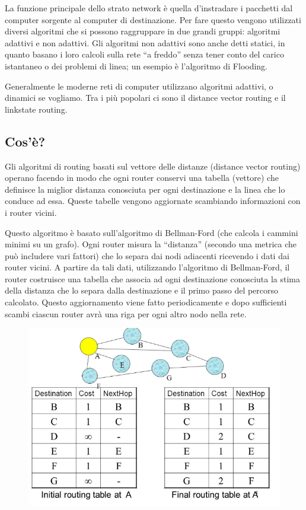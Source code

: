 La funzione principale dello strato network è quella d’instradare i pacchetti dal computer sorgente al computer di destinazione. Per fare questo vengono utilizzati diversi algoritmi che si possono raggruppare in due grandi gruppi: algoritmi adattivi e non adattivi. Gli algoritmi non adattivi sono anche detti statici, in quanto basano i loro calcoli sulla rete “a freddo” senza tener conto del carico istantaneo o dei problemi di linea; un esempio è l’algoritmo di Flooding.

Generalmente le moderne reti di computer utilizzano algoritmi adattivi, o dinamici se vogliamo. Tra i più popolari ci sono il distance vector routing e il linkstate routing.
\subsection{Cos'è?}
Gli algoritmi di routing basati sul vettore delle distanze (distance vector routing) operano facendo in modo che ogni router conservi una tabella (vettore) che definisce la miglior distanza conosciuta per ogni destinazione e la linea che lo conduce ad essa. Queste tabelle vengono aggiornate scambiando informazioni con i router vicini.

Questo algoritmo è basato sull’algoritmo di Bellman-Ford (che calcola i cammini minimi su un grafo).
Ogni router misura la “distanza” (secondo una metrica che può includere vari fattori) che lo separa dai nodi adiacenti ricevendo i dati dai router vicini. A partire da tali dati, utilizzando l’algoritmo di Bellman-Ford, il router costruisce una tabella che associa ad ogni destinazione conosciuta la stima della distanza che lo separa dalla destinazione e il primo passo del percorso calcolato.
Questo aggiornamento viene fatto periodicamente e dopo sufficienti scambi ciascun router avrà una riga per ogni altro nodo nella rete.

\begin{figure}[H]
\centering
\includegraphics[scale=0.8]{res/img/33_DistanceVectorRouting.png}
\end{figure} 



